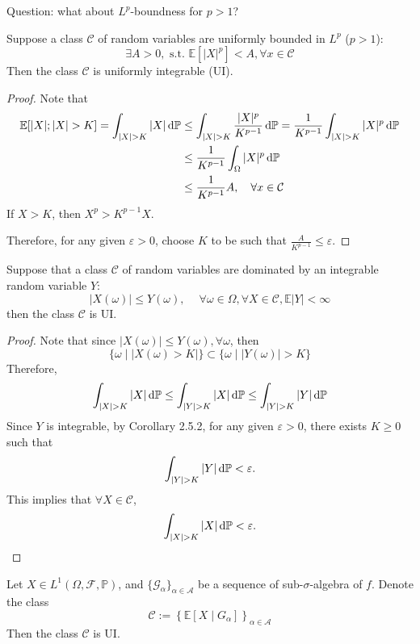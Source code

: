 Question: what about $L^p$-boundness for $p>1$?

\begin{theorem}
Suppose a class $\mathcal{C}$ of random variables are uniformly bounded in $L^p$ ($p>1$):
\[
\exists A>0,\text{ s.t. }\mathbb{E}[|X|^p]<A,\forall x\in\mathcal{C}
\]
Then the class $\mathcal{C}$ is uniformly integrable (UI).
\end{theorem}

\begin{proof}
Note that
\begin{align*}
\mathbb{E}[|X|;|X|>K]=\int_{|X|>K}|X|\diff\mathbb{P}
&\le
\int_{|X|>K}\frac{|X|^p}{K^{p-1}}\diff\mathbb{P}
=
\frac{1}{K^{p-1}}\int_{|X|>K}|X|^p\diff\mathbb{P}\\
&\le\frac{1}{K^{p-1}}\int_{\Omega}|X|^p\diff\mathbb{P}\\
&\le\frac{1}{K^{p-1}}A,\quad\forall x\in\mathcal{C}
\end{align*}
If $X>K$, then $X^p>K^{p-1}X$.

Therefore, for any given $\varepsilon>0$, choose $K$ to be such that $\frac{A}{K^{p-1}}\le\varepsilon$.

\end{proof}

\begin{theorem}
Suppose that a class $\mathcal{C}$ of random variables are dominated by an integrable random variable $Y$:
\[
|X(\omega)|\le Y(\omega),\ \quad
\forall\omega\in\Omega,\forall X\in\mathcal{C},
\mathbb{E}|Y|<\infty
\]
then the class $\mathcal{C}$ is UI.
\end{theorem}

\begin{proof}
Note that since $|X(\omega)|\le Y(\omega),\forall\omega$, then
\[
\{\omega\mid |X(\omega)>K|\}\subset
\{\omega\mid|Y(\omega)|>K\}
\]
Therefore,
\[
\int_{|X|>K}|X|\diff\mathbb{P}\le
\int_{|Y|>K}|X|\diff\mathbb{P}\le
\int_{|Y|>K}|Y|\diff\mathbb{P}
\]
Since $Y$ is integrable, by Corollary 2.5.2, for any given $\varepsilon>0$, there exists $K\ge0$ such that
\[
\int_{|Y|>K}|Y|\diff\mathbb{P}<\varepsilon.
\]
This implies that $\forall X\in\mathcal{C}$,
\[
\int_{|X|>K}|X|\diff\mathbb{P}<\varepsilon.
\]
\end{proof}

\begin{theorem}
Let $X\in L^1(\Omega,\mathcal{F},\mathbb{P})$, and $\{\mathcal{G}_\alpha\}_{\alpha\in\mathcal{A}}$ be a sequence of sub-$\sigma$-algebra of $f$. Denote the class
\[
\mathcal{C}:=\left\{\mathbb{E}[X\mid G_\alpha]\right\}_{\alpha\in\mathcal{A}}
\]
Then the class $\mathcal{C}$ is UI.
\end{theorem}










